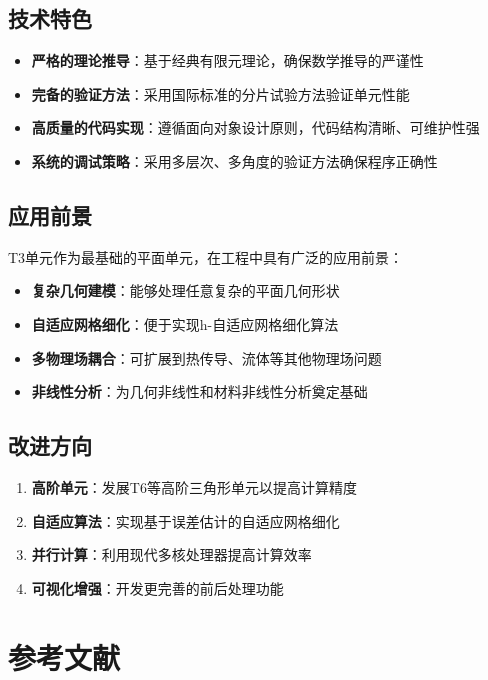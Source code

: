 \documentclass[12pt,a4paper]{article}
\begin{document}
\subsection{技术特色}

\begin{itemize}
    \item \textbf{严格的理论推导}：基于经典有限元理论，确保数学推导的严谨性
    \item \textbf{完备的验证方法}：采用国际标准的分片试验方法验证单元性能
    \item \textbf{高质量的代码实现}：遵循面向对象设计原则，代码结构清晰、可维护性强
    \item \textbf{系统的调试策略}：采用多层次、多角度的验证方法确保程序正确性
\end{itemize}

\subsection{应用前景}

T3单元作为最基础的平面单元，在工程中具有广泛的应用前景：

\begin{itemize}
    \item \textbf{复杂几何建模}：能够处理任意复杂的平面几何形状
    \item \textbf{自适应网格细化}：便于实现h-自适应网格细化算法
    \item \textbf{多物理场耦合}：可扩展到热传导、流体等其他物理场问题
    \item \textbf{非线性分析}：为几何非线性和材料非线性分析奠定基础
\end{itemize}

\subsection{改进方向}

\begin{enumerate}
    \item \textbf{高阶单元}：发展T6等高阶三角形单元以提高计算精度
    \item \textbf{自适应算法}：实现基于误差估计的自适应网格细化
    \item \textbf{并行计算}：利用现代多核处理器提高计算效率
    \item \textbf{可视化增强}：开发更完善的前后处理功能
\end{enumerate}

\section{参考文献}
\end{document}
